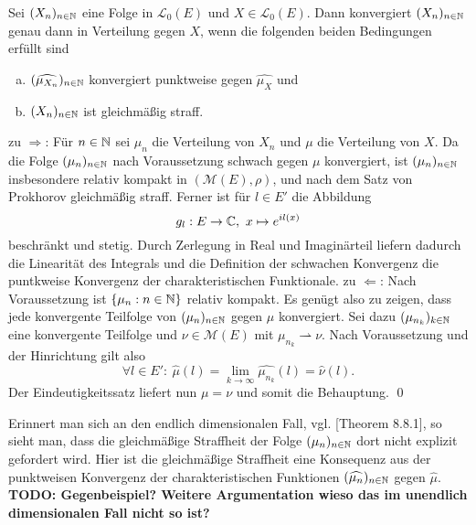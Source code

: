 \begin{theorem}
    Sei $(X_n)_{n \in \mathbb{N}}$ eine Folge in $\mathcal{L}_0(E)$ und $X \in \mathcal{L}_0(E)$. 
    Dann konvergiert $(X_n)_{n \in \mathbb{N}}$ genau dann in Verteilung gegen $X$, wenn die folgenden beiden Bedingungen erfüllt sind
    \begin{enumerate}[(a)]
        \item $(\widehat{\mu_{X_n}})_{n \in \mathbb{N}}$ konvergiert punktweise gegen $\widehat{\mu_X}$ und
        \item $(X_n)_{n \in \mathbb{N}}$ ist gleichmäßig straff. 
    \end{enumerate}
\end{theorem}

\begin{proof*}
    zu $\Rightarrow$: Für $n \in \mathbb{N}$ sei $\mu_n$ die Verteilung von $X_n$ und $\mu$ die Verteilung von $X$. Da die Folge $(\mu_n)_{n \in \mathbb{N}}$ nach Voraussetzung schwach gegen $\mu$ konvergiert, 
    ist $(\mu_n)_{n \in  \mathbb{N}}$ insbesondere relativ kompakt in $(\mathcal{M}(E), \rho)$, und nach dem Satz von Prokhorov gleichmäßig straff. 
    Ferner ist für $l \in E'$ die Abbildung 
    $$
        g_l: E \to \mathbb{C},  \ x \mapsto e^{il(x)}
    $$ 
    beschränkt und stetig. Durch Zerlegung in Real und Imaginärteil liefern dadurch die Linearität des Integrals und die Definition der schwachen Konvergenz die puntkweise Konvergenz der charakteristischen Funktionale. 
    \newline 
    zu $\Leftarrow$: Nach Voraussetzung ist  $\{\mu_n : n \in \mathbb{N}\}$ relativ kompakt. Es genügt also zu zeigen, dass jede konvergente Teilfolge von $(\mu_n)_{n \in \mathbb{N}}$ gegen $\mu$ konvergiert. 
    Sei dazu $(\mu_{n_k})_{k \in \mathbb{N}}$ eine konvergente Teilfolge und $\nu \in \mathcal{M}(E)$ mit $\mu_{n_k} \rightharpoonup \nu$. Nach Voraussetzung und der Hinrichtung gilt also 
    $$
        \forall l \in E': \ \widehat{\mu}(l) = \lim_{k \to \infty} \widehat{\mu_{n_k}}(l) = \widehat{\nu}(l).
    $$
    Der Eindeutigkeitssatz liefert nun $\mu = \nu$ und somit die Behauptung. \qed
\end{proof*}

\begin{remark}
    Erinnert man sich an den endlich dimensionalen Fall, vgl. \cite{Bogachev}[Theorem 8.8.1], so sieht man, dass die gleichmäßige Straffheit der Folge $(\mu_n)_{n \in \mathbb{N}}$ dort nicht explizit gefordert wird. 
    Hier ist die gleichmäßige Straffheit eine Konsequenz aus der punktweisen Konvergenz der charakteristischen Funktionen $(\widehat{\mu_n})_{n \in \mathbb{N}}$ gegen $\widehat{\mu}$. 
    \textbf{TODO: Gegenbeispiel? Weitere Argumentation wieso das im unendlich dimensionalen Fall nicht so ist?}
\end{remark}

